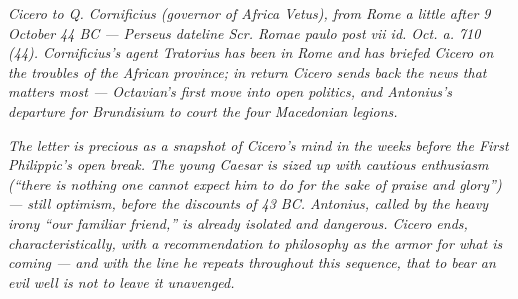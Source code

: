 
\textit{Cicero to Q. Cornificius (governor of Africa Vetus), from Rome a little after 9 October 44 BC ---
Perseus dateline \textit{Scr. Romae paulo post vii id. Oct. a. 710 (44)}. Cornificius's agent Tratorius has been in Rome and has briefed Cicero on the troubles of the African province; in return Cicero sends back the news that matters most --- Octavian's first move into open politics, and Antonius's departure for Brundisium to court the four Macedonian legions.}

\textit{The letter is precious as a snapshot of Cicero's mind in the weeks before the First Philippic's open break. The young Caesar is sized up with cautious enthusiasm (``there is nothing one cannot expect him to do for the sake of praise and glory'') --- still optimism, before the discounts of 43 BC. Antonius, called by the heavy irony ``our familiar friend,'' is already isolated and dangerous. Cicero ends, characteristically, with a recommendation to philosophy as the armor for what is coming --- and with the line he repeats throughout this sequence, that to bear an evil well is not to leave it unavenged.}
